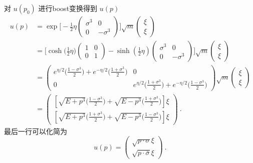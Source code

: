 \begin{exercise}{对 $u(p_0)$ 进行boost变换得到 $u(p)$}
\begin{align}\nonumber
u(p) & = \exp \bigg[ - \frac{1}{2} \eta \begin{pmatrix}
\sigma^3 & 0 \\ 
0 & - \sigma^3
\end{pmatrix} \bigg] \sqrt{m} \begin{pmatrix}
\xi \\ \xi
\end{pmatrix} \\ \nonumber
& = \bigg[ \cosh\big(\frac{1}{2}\eta\big)\begin{pmatrix}
1 & 0 \\
0 & 1
\end{pmatrix} - \sinh (\frac{1}{2}\eta) \begin{pmatrix}
\sigma^3 & 0 \\ \nonumber
0 & - \sigma^3
\end{pmatrix} \bigg]\sqrt{m} \begin{pmatrix}
\xi \\ \xi
\end{pmatrix} \\ \nonumber
& = \begin{pmatrix}
e^{\eta/2}\bigg(\frac{1-\sigma^3}{2}\bigg)+e^{-\eta/2}\bigg(\frac{1+\sigma^3}{2}\bigg) & 0\\
0 & e^{\eta/2}\bigg(\frac{1+\sigma^3}{2}\bigg)+e^{-\eta/2}\bigg(\frac{1-\sigma^3}{2}\bigg)
\end{pmatrix}\sqrt{m}\begin{pmatrix}
\xi \\ 
\xi
\end{pmatrix} \\\nonumber
& = \begin{pmatrix}
[\sqrt{E+p^3}\bigg(\frac{1-\sigma^3}{2}\bigg)+\sqrt{E-p^3}\bigg(\frac{1+\sigma^3}{2}\bigg)]\xi \\
[\sqrt{E+p^3}\bigg(\frac{1+\sigma^3}{2}\bigg)+\sqrt{E-p^3}\bigg(\frac{1-\sigma^3}{2}\bigg)]\xi
\end{pmatrix}~.
\end{align}
最后一行可以化简为
\begin{equation}
u(p) = \begin{pmatrix}
\sqrt{p\cdot\sigma}\xi \\
\sqrt{p\cdot\bar\sigma}\xi
\end{pmatrix}~.
\end{equation}
\end{exercise}
